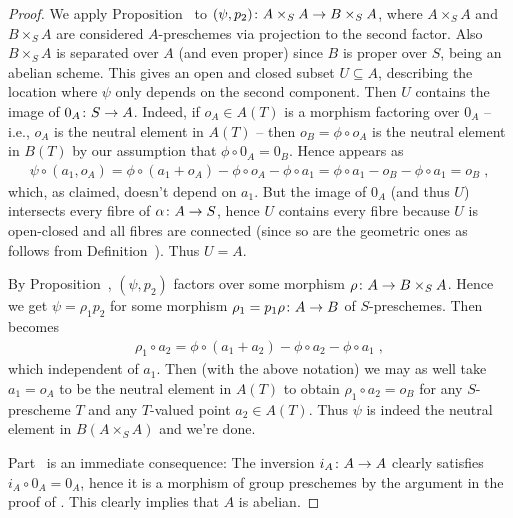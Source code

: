 \documentclass[a4paper,parskip=half,numbers=enddot, DIV=12]{scrreprt}
\begin{document}
\begin{proof}
	We apply Proposition~ to $(\psi,p_2)\colon A\times_SA\morphism B\times_SA$, where $A\times_SA$ and $B\times_SA$ are considered $A$-preschemes via projection to the second factor. Also $B\times_SA$ is separated over $A$ (and even proper) since $B$ is proper over $S$, being an abelian scheme. This gives an open and closed subset $U\subseteq A$, describing the location where $\psi$ only depends on the second component. Then $U$ contains the image of $0_A\colon S\morphism A$. Indeed, if $o_A\in A(T)$ is a morphism factoring over $0_A$ -- i.e., $o_A$ is the neutral element in $A(T)$ -- then $o_B=\phi\circ o_A$ is the neutral element in $B(T)$ by our assumption that $\phi\circ 0_A=0_B$. Hence  appears as
	\begin{align*}
		\psi\circ(a_1,o_A)=\phi\circ (a_1+o_A)-\phi\circ o_A-\phi\circ a_1=\phi\circ a_1 -o_B-\phi\circ a_1=o_B\;,
	\end{align*}
	which, as claimed, doesn't depend on $a_1$. But the image of $0_A$ (and thus $U$) intersects every fibre of $\alpha\colon A\morphism S$, hence $U$ contains every fibre because $U$ is open-closed and all fibres are connected
	(since so are the geometric ones as follows from Definition~). Thus $U=A$.
	
	By Proposition~, $(\psi,p_2)$ factors over some morphism $\rho\colon A\morphism B\times_SA$. Hence we get $\psi=\rho_1 p_2$ for some morphism $\rho_1=p_1\rho\colon A\morphism B$ of $S$-preschemes. Then  becomes
	\begin{align*}
		\rho_1\circ a_2=\phi\circ(a_1+a_2)-\phi\circ a_2-\phi\circ a_1\;,
	\end{align*}
	which independent of $a_1$. Then (with the above notation) we may as well take $a_1=o_A$ to be the neutral element in $A(T)$ to obtain $\rho_1\circ a_2=o_B$ for any $S$-prescheme $T$ and any $T$-valued point $a_2\in A(T)$. Thus $\psi$ is indeed the neutral element in $B(A\times_SA)$ and we're done.
	
	Part~ is an immediate consequence: The inversion $i_A\colon A\morphism A$ clearly satisfies $i_A\circ 0_A=0_A$, hence it is a morphism of group preschemes by the argument in the proof of . This clearly implies that $A$ is abelian.
	

\end{proof}
\end{document}
